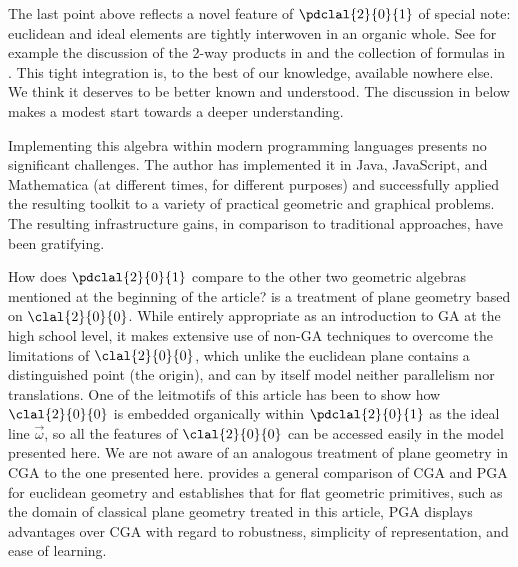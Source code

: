 \documentclass{birkjour}
\begin{document}
The last point above reflects a novel feature of $\pdclal{2}{0}{1}$ of special note: euclidean and ideal elements are tightly interwoven in an organic whole.  See for example the discussion of the 2-way products in  and the collection of formulas in . This tight integration is, to the best of our knowledge, available nowhere else.  We think it deserves to be better known and understood.  The discussion in   below makes a modest start towards a deeper  understanding.

Implementing this algebra within modern programming languages presents no significant challenges.  The author has implemented it in Java, JavaScript, and Mathematica (at different times, for different purposes) and  successfully applied the resulting toolkit to a variety of practical geometric and graphical problems. The resulting infrastructure gains, in comparison to traditional approaches, have been gratifying.

How does  $\pdclal{2}{0}{1}$ compare to the other two geometric algebras mentioned at the beginning of the article?  \cite{calvet2007} is a treatment of plane geometry based on $\clal{2}{0}{0}$.  While entirely appropriate as an introduction to GA at the high school level, it  makes extensive use of non-GA techniques to overcome the limitations of $\clal{2}{0}{0}$, which unlike the euclidean plane contains a distinguished point (the origin), and can by itself model neither parallelism nor translations.  One of the leitmotifs of this article has been to show how $\clal{2}{0}{0}$ is embedded organically within  $\pdclal{2}{0}{1}$ as the ideal line $ \vec{\omega}$, so all the features of $\clal{2}{0}{0}$ can be accessed easily in the model presented here.
We are not aware of an analogous treatment of plane geometry in CGA to the one presented here.  \cite{gunn2016} provides a general comparison of CGA and PGA for euclidean geometry and establishes that for flat geometric primitives, such as the domain of classical plane geometry treated in this article, PGA displays advantages over CGA with regard to robustness, simplicity of representation, and ease of learning.
\end{document}
